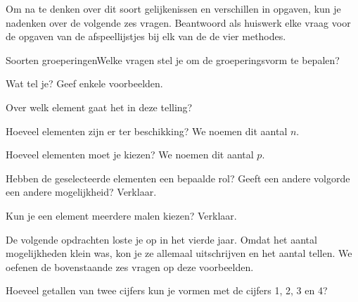 Om na te denken over dit soort gelijkenissen en verschillen in opgaven, kun je nadenken over de volgende zes vragen. Beantwoord als huiswerk elke vraag voor de opgaven van de afspeellijstjes bij elk van de de vier methodes.

\begin{stellingkadertwee}
{Soorten groeperingen}{Welke vragen stel je om de groeperingsvorm te bepalen?}
{\begin{nummering}
\item{Wat tel je? Geef enkele voorbeelden.}
\item{Over welk element gaat het in deze telling?}
\item{Hoeveel elementen zijn er ter beschikking? We noemen dit aantal $n$.}
\item{ Hoeveel elementen moet je kiezen? We noemen dit aantal $p$.}
\item {Hebben de geselecteerde elementen een bepaalde rol? Geeft een andere volgorde een andere mogelijkheid? Verklaar.}
\item {Kun je een element meerdere malen kiezen? Verklaar.}
\end{nummering}}
\end{stellingkadertwee}

De volgende opdrachten loste je op in het vierde jaar. Omdat het aantal mogelijkheden klein was, kon je ze allemaal uitschrijven en het aantal tellen. We oefenen de bovenstaande zes vragen op deze voorbeelden. 


Hoeveel getallen van twee cijfers kun je vormen met de cijfers 1, 2, 3 en 4?

